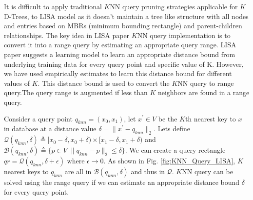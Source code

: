 It is difficult to apply traditional $K$NN query pruning strategies applicable for $K$D-Trees, to LISA model as it doesn't maintain a tree like structure with all nodes and
entries based on MBRs (minimum bounding rectangle) and parent-children relationships. %
The key idea in LISA paper $K$NN query implementation is to convert it into a range query by estimating an appropriate query range. LISA paper suggests a learning model to learn an appropriate distance bound from underlying training data for every query point and specific value of K. However, we have used empirically estimates to learn this distance bound for different values of $K$. This distance bound is used to convert the $K$NN query to range query.The query range is augmented if less than $K$ neighbors are found in a range query. 

Consider a query point $q_{knn}=(x_{0},x_{1})$, let $x^{'} \in V$ be the $K$th nearest key to $x$ in database at a distance value $\delta = \| x^{'}-q_{knn}\|_{2} $. Lets define $ \mathcal{Q}(q_{knn},\delta) \triangleq [x_{0}-\delta, x_{0}+\delta) \times[x_{1}-\delta, x_{1}+\delta)$ and $\mathcal{B}(q_{knn}, \delta)  \triangleq \{p \in V \mid \| q_{knn}-p\|_{2} \leq \delta \} $. We can create a query rectangle $qr =  \mathcal{Q}(q_{knn}, \delta + \epsilon)$ where $\epsilon \rightarrow 0$. As shown in Fig. \ref{fig:KNN_Query_LISA}, $K$ nearest keys to $q_{knn}$ are all in $\mathcal{B}(q_{knn}, \delta)$ and thus in $\mathcal{Q}$. $K$NN query can be solved using the range query if we can estimate an appropriate distance bound $\delta$ for every query point.

